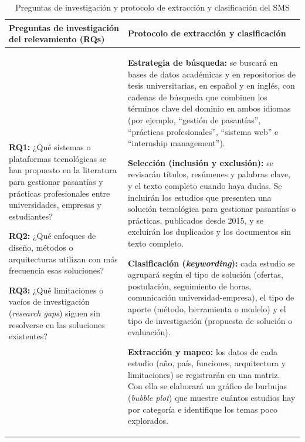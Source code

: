 \begin{table}[htbp]
\centering
\footnotesize
\caption{Preguntas de investigación y protocolo de extracción y clasificación del SMS}\label{tab:sms-protocolo}
\begin{tabularx}{\textwidth}{|X|X|}
\hline
\rowcolor{gray!15}
\textbf{Preguntas de investigación del relevamiento (RQs)} & \textbf{Protocolo de extracción y clasificación} \\ \hline
\textbf{RQ1:} ¿Qué sistemas o plataformas tecnológicas se han propuesto en la literatura para gestionar pasantías y prácticas profesionales entre universidades, empresas y estudiantes?
\vspace{0.2cm}

\textbf{RQ2:} ¿Qué enfoques de diseño, métodos o arquitecturas utilizan con más frecuencia esas soluciones?
\vspace{0.2cm}

\textbf{RQ3:} ¿Qué limitaciones o vacíos de investigación (\textit{research gaps}) siguen sin resolverse en las soluciones existentes? &
\textbf{Estrategia de búsqueda:} se buscará en bases de datos académicas y en repositorios de tesis universitarias, en español y en inglés, con cadenas de búsqueda que combinen los términos clave del dominio en ambos idiomas (por ejemplo, ``gestión de pasantías'', ``prácticas profesionales'', ``sistema web'' e ``internship management'').
\vspace{0.2cm}

\textbf{Selección (inclusión y exclusión):} se revisarán títulos, resúmenes y palabras clave, y el texto completo cuando haya dudas. Se incluirán los estudios que presenten una solución tecnológica para gestionar pasantías o prácticas, publicados desde 2015, y se excluirán los duplicados y los documentos sin texto completo.
\vspace{0.2cm}

\textbf{Clasificación (\textit{keywording}):} cada estudio se agrupará según el tipo de solución (ofertas, postulación, seguimiento de horas, comunicación universidad-empresa), el tipo de aporte (método, herramienta o modelo) y el tipo de investigación (propuesta de solución o evaluación).
\vspace{0.2cm}

\textbf{Extracción y mapeo:} los datos de cada estudio (año, país, funciones, arquitectura y limitaciones) se registrarán en una matriz. Con ella se elaborará un gráfico de burbujas (\textit{bubble plot}) que muestre cuántos estudios hay por categoría e identifique los temas poco explorados. \\ \hline
\end{tabularx}
\end{table}

